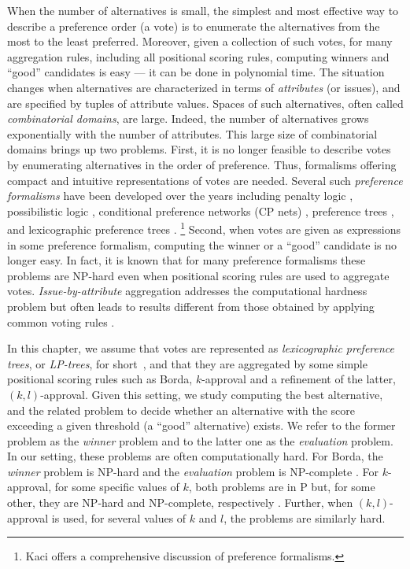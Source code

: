 When the number of alternatives is small, the simplest and most effective 
way to describe a preference order (a vote) is to enumerate the
alternatives from the most to the least preferred. Moreover, given a 
collection of such votes, for many aggregation rules, including all 
positional scoring rules, computing winners and ``good'' candidates is 
easy --- it can be done in polynomial time. The situation changes when
alternatives are characterized in terms of \emph{attributes} (or issues),
and are specified by tuples of attribute values. Spaces of such alternatives,
often called \emph{combinatorial domains}, are large. Indeed, the number 
of alternatives grows exponentially with the number of attributes. This
large size of combinatorial domains brings up two problems. First, it is
no longer feasible to describe votes by enumerating alternatives in the
order of preference. Thus, formalisms offering compact and intuitive
representations of votes are needed. Several such \emph{preference
formalisms} have been developed over the years including penalty logic 
\cite{de1994penalty}, possibilistic logic \cite{DuboisLP91}, conditional
preference networks (CP nets) \cite{bbdh03}, preference
trees \cite{what}, and lexicographic preference trees \cite{what}.%
\footnote{Kaci \cite{Kaci:Pref} offers a comprehensive discussion of 
preference formalisms.} Second, when votes are given as expressions in 
some preference formalism, computing the winner or a ``good'' candidate 
is no longer easy. In fact, it is known that for many preference formalisms 
these problems are NP-hard even when positional scoring rules are used 
to aggregate votes. \emph{Issue-by-attribute} aggregation addresses the
computational hardness problem but often leads to results different from 
those obtained by applying common voting rules \cite{fargier:ibi}.
  
In this chapter, we assume that votes are represented as \emph{lexicographic
preference trees}, or \emph{LP-trees}, for short~\cite{booth:learningLP},
and that they are aggregated by some simple positional scoring rules such 
as Borda, $k$-approval and a refinement of the latter, $(k,l)$-approval.
Given this setting, we study computing the best alternative, and the related 
problem to decide whether an alternative with the score exceeding a given 
threshold (a ``good'' alternative) exists. We refer to the former problem 
as the \emph{winner} problem and to the latter one as 
the \emph{evaluation} problem. In our setting, these problems are often
computationally hard. For Borda, the \emph{winner} problem is NP-hard and 
the \emph{evaluation} problem is NP-complete \cite{lang:aggLP}. For $k$-approval, 
for some specific values of $k$, both problems are in P but, for some other, 
they are NP-hard and NP-complete, respectively \cite{lang:aggLP}. Further,
when $(k,l)$-approval is used, for several values 
of $k$ and $l$, the problems are similarly hard.

